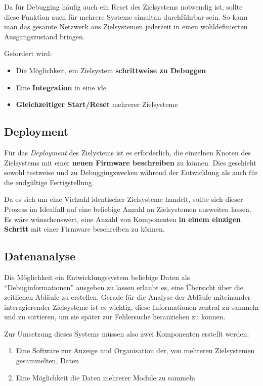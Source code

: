 Da für Debugging häufig auch ein Reset des Zielsystems notwendig ist, sollte
diese Funktion auch für mehrere Systeme simultan durchführbar sein.
So kann man das gesamte Netzwerk aus Zielsystemen jederzeit in einen
wohldefinierten Ausgangszustand bringen.

Gefordert wird:
\begin{itemize}
  \item Die Möglichkeit, ein Zielsystem \textbf{schrittweise zu Debuggen}
  \item Eine \textbf{Integration} in eine \gls{ide}
  \item \textbf{Gleichzeitiger Start/Reset} mehrerer Zielsysteme
\end{itemize}

\subsection{Deployment} Für das \emph{Deployment} des Zielystems ist es
erforderlich, die einzelnen Knoten des Zielsystems mit einer \textbf{neuen Firmware
beschreiben} zu können. Dies geschieht sowohl testweise und zu Debuggingzwecken
während der Entwicklung als auch für die endgültige Fertigstellung. 

Da es sich um eine Vielzahl identischer Zielsysteme handelt, sollte sich dieser
Prozess im Idealfall auf eine beliebige Anzahl an Zielsystemen ausweiten lassen.
Es wäre wünschenswert, eine Anzahl von Komponenten \textbf{in einem einzigen
Schritt} mit einer Firmware beschreiben zu können.

\subsection{Datenanalyse}
Die Möglichkeit ein Entwicklungssystem beliebige
Daten als "`Debuginformationen"' ausgeben zu lassen erlaubt es, eine
Übersicht über die zeitlichen Abläufe zu erstellen. Gerade für die
Analyse der Abläufe miteinander interagierender Zielsysteme ist es wichtig,
diese Informationen zentral zu sammeln und zu sortieren, um sie später zur
Fehlersuche heranziehen zu können.

Zur Umsetzung dieses Systems müssen also zwei Komponenten erstellt werden:
\begin{enumerate}
  \item Eine Software zur Anzeige und Organisation der, von mehreren
  Zielsystemen gesammelten, Daten
  \item Eine Möglichkeit die Daten mehrerer Module zu sammeln
\end{enumerate}

